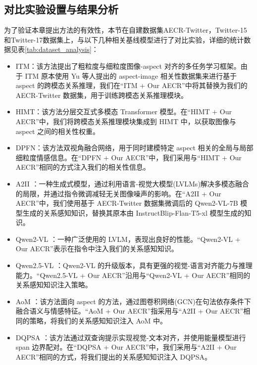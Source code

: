 \subsection{对比实验设置与结果分析}
为了验证本章提出方法的有效性，本节在自建数据集AECR-Twitter，Twitter-15 和Twitter-17数据集上，与以下几种相关基线模型进行了对比实验，详细的统计数据见表\ref{tab:dataset_analysis}：
\begin{itemize}
  \item ITM\cite{yu2022targeted}：该方法提出了粗粒度与细粒度图像-aspect 对齐的多任务学习框架。由于 ITM 原本使用 Yu 等人提出的 aspect-image 相关性数据集来进行基于 aspect 的跨模态关系推理，我们在“ITM + Our AECR”中将其替换为我们的 AECR-Twitter 数据集，用于训练跨模态关系推理模块。
  \item HIMT\cite{yu2022hierarchical}：该方法分层交互式多模态 Transformer 模型。在“HIMT + Our AECR”中，我们将跨模态关系推理模块集成到 HIMT 中，以获取图像与 aspect 之间的相关性权重。
  \item DPFN\cite{wang2023dual}：该方法双视角融合网络，用于同时建模特定 aspect 相关的全局与局部细粒度情感信息。在“DPFN + Our AECR”中，我们采用与“HIMT + Our AECR”相同的方式注入我们的相关性信息。
  \item A2II \cite{feng2024autonomous}：一种生成式模型，通过利用语言-视觉大模型(LVLMs)解决多模态融合的局限，并通过指令微调减轻无关图像噪声的影响。在“A2II + Our AECR”中，我们使用基于 AECR-Twitter 数据集微调后的 Qwen2-VL-7B 模型生成的关系感知知识，替换其原本由 InstructBlip-Flan-T5-xl \cite{NEURIPS2023_9a6a435e}模型生成的知识。
  \item Qwen2-VL \cite{wang2024qwen2}：一种广泛使用的 LVLM，表现出良好的性能。“Qwen2-VL + Our AECR”表示在指令中注入我们的关系感知知识。
  \item Qwen2.5-VL \cite{bai2025qwen2}：Qwen2-VL 的升级版本，具有更强的视觉-语言对齐能力与推理能力。“Qwen2.5-VL + Our AECR”沿用与“Qwen2-VL + Our AECR”相同的关系感知知识注入策略。
  \item AoM \cite{zhou2023aomdetectingaspectorientedinformation}：该方法面向 aspect 的方法，通过图卷积网络(GCN)在句法依存条件下融合语义与情感特征。“AoM + Our AECR”指采用与“A2II + Our AECR”相同的策略，将我们的关系感知知识注入 AoM 中。
  \item DQPSA \cite{peng2024novel}：该方法通过双查询提示实现视觉-文本对齐，并使用能量模型进行 span 边界配对。在“DQPSA + Our AECR”中，我们采用与“A2II + Our AECR”相同的方式，将我们提出的关系感知知识注入 DQPSA。
\end{itemize}

